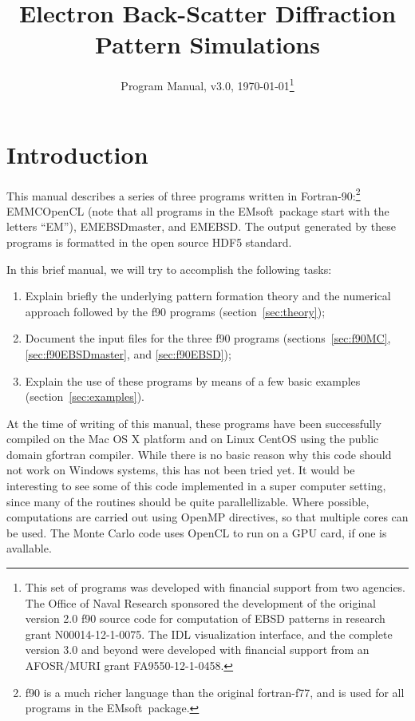 \documentclass[DIV=calc, paper=letter, fontsize=11pt]{scrartcl}	 %
\title{Electron Back-Scatter Diffraction Pattern Simulations} %
\author{\vspace*{-0.7in}} %
\date{Program Manual, v3.0, \today\protect\footnote{This set of programs was developed with financial support from two agencies. 
The Office of Naval Research sponsored the development of the original version 2.0 f90 source code for computation of EBSD patterns in research 
grant N00014-12-1-0075.  The IDL visualization interface, and the complete version 3.0 and beyond were developed with financial 
support from an AFOSR/MURI grant FA9550-12-1-0458.}}
\newcommand{\ctp}{\textsf{EMsoft}}
\begin{document}
\maketitle

\begin{figure}[h]
\leavevmode\centering
{}
\end{figure}

\renewcommand{\contentsname}{Table of Contents}
{\small\tableofcontents}

\newpage
\section{Introduction}
This manual describes a series of three programs written in Fortran-90:\footnote{f90 is a much richer language than the original fortran-f77, and is
used for all programs in the \ctp\ package.} 
\textsf{EMMCOpenCL} (note that all programs in the \ctp\ package start with the letters ``EM''), \textsf{EMEBSDmaster},
and \textsf{EMEBSD}.
The output generated by these programs is formatted in the open source HDF5 standard.

In this brief manual, we will try to accomplish the following tasks:
\begin{enumerate}
	\item Explain briefly the underlying pattern formation theory and the numerical approach followed by the f90 programs (section~\ref{sec:theory});
	\item Document the input files for the three f90 programs (sections~\ref{sec:f90MC}, \ref{sec:f90EBSDmaster}, and \ref{sec:f90EBSD});
	\item Explain the use of these programs by means of a few basic examples (section~\ref{sec:examples}).
\end{enumerate}

At the time of writing of this manual, these programs have been successfully compiled on the Mac OS X platform and on Linux CentOS using the public domain gfortran compiler.  
While there is no basic reason why this code should not work on Windows systems, this has not been tried yet.
It would be interesting to see some of this code implemented in a super computer setting, since many of the routines should be quite parallellizable.  Where possible, computations
are carried out using OpenMP directives, so that multiple cores can be used.  The Monte Carlo code uses OpenCL to run on a GPU card, if one is avallable.
\end{document}
